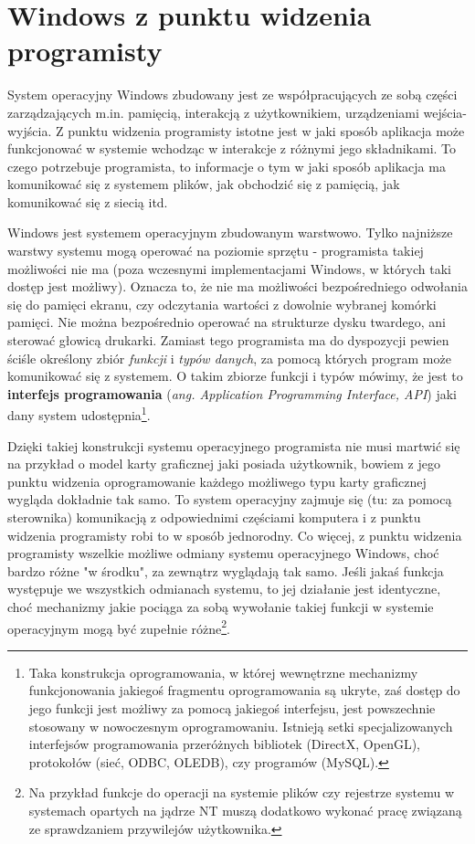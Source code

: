 \section{Windows z punktu widzenia programisty}

System operacyjny Windows zbudowany jest ze współpracujących ze sobą części zarządzających m.in. 
pamięcią, interakcją z użytkownikiem, urządzeniami wejścia-wyjścia. Z punktu widzenia programisty
istotne jest w jaki sposób aplikacja może funkcjonować w systemie 
wchodząc w interakcje z różnymi jego składnikami. To czego potrzebuje programista, to informacje
o tym w jaki sposób aplikacja ma komunikować się z systemem plików, jak obchodzić się z pamięcią, 
jak komunikować się z siecią itd.

Windows jest systemem operacyjnym zbudowanym warstwowo. Tylko najniższe warstwy systemu mogą operować
na poziomie sprzętu - programista takiej możliwości nie ma (poza wczesnymi implementacjami Windows, 
w których taki dostęp jest możliwy). 
Oznacza to, że nie ma możliwości bezpośredniego odwołania się do pamięci ekranu, czy odczytania wartości
z dowolnie wybranej komórki pamięci. Nie można bezpośrednio operować na strukturze dysku twardego, ani
sterować głowicą drukarki. Zamiast tego programista ma do dyspozycji pewien ściśle określony zbiór
{\em funkcji} i {\em typów danych}, za pomocą których program może komunikować się z systemem. 
O takim zbiorze funkcji i typów mówimy, że jest to {\bf interfejs programowania} 
({\em ang. Application Programming Interface, API}) 
jaki dany system udostępnia\footnote{Taka konstrukcja oprogramowania, 
w której wewnętrzne mechanizmy funkcjonowania jakiegoś fragmentu
oprogramowania są ukryte, zaś dostęp do jego funkcji jest możliwy za pomocą jakiegoś interfejsu, 
jest powszechnie stosowany w nowoczesnym oprogramowaniu. Istnieją setki specjalizowanych interfejsów 
programowania przeróżnych bibliotek (DirectX, OpenGL), protokołów (sieć, ODBC, OLEDB), czy programów (MySQL).}.

Dzięki takiej konstrukcji systemu operacyjnego programista nie musi martwić się na przykład o 
model karty graficznej jaki posiada użytkownik, bowiem z jego punktu widzenia oprogramowanie każdego możliwego
typu karty graficznej wygląda dokładnie tak samo. To system operacyjny zajmuje się (tu: za pomocą sterownika)
komunikacją z odpowiednimi częściami komputera i z punktu widzenia programisty robi to w sposób
jednorodny. Co więcej, z punktu widzenia programisty wszelkie możliwe
odmiany systemu operacyjnego Windows, choć bardzo różne "w środku", za zewnątrz wyglądają tak samo. Jeśli
jakaś funkcja występuje we wszystkich odmianach systemu, to jej działanie jest identyczne, choć mechanizmy
jakie pociąga za sobą wywołanie takiej funkcji w systemie operacyjnym mogą być 
zupełnie różne\footnote{Na przykład funkcje do operacji na systemie plików 
czy rejestrze systemu w systemach opartych
na jądrze NT muszą dodatkowo wykonać pracę związaną ze sprawdzaniem przywilejów użytkownika.}.

